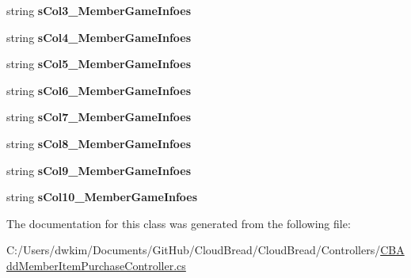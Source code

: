 \begin{DoxyCompactItemize}
\item 
string {\bfseries s\+Col3\+\_\+\+Member\+Game\+Infoes}\hypertarget{a00124_ab735a0ddfb117d85e0cd425fc35d211f}{}\label{a00124_ab735a0ddfb117d85e0cd425fc35d211f}

\item 
string {\bfseries s\+Col4\+\_\+\+Member\+Game\+Infoes}\hypertarget{a00124_a41e17be486561957eb770c1268fbefac}{}\label{a00124_a41e17be486561957eb770c1268fbefac}

\item 
string {\bfseries s\+Col5\+\_\+\+Member\+Game\+Infoes}\hypertarget{a00124_a1fb82579ba67947f34684bbcc304e75a}{}\label{a00124_a1fb82579ba67947f34684bbcc304e75a}

\item 
string {\bfseries s\+Col6\+\_\+\+Member\+Game\+Infoes}\hypertarget{a00124_a2531d163ec3219e281c0e7a6b9ddb27d}{}\label{a00124_a2531d163ec3219e281c0e7a6b9ddb27d}

\item 
string {\bfseries s\+Col7\+\_\+\+Member\+Game\+Infoes}\hypertarget{a00124_a56377cc7982e7d62c0d21480a175687b}{}\label{a00124_a56377cc7982e7d62c0d21480a175687b}

\item 
string {\bfseries s\+Col8\+\_\+\+Member\+Game\+Infoes}\hypertarget{a00124_a1b65e916b4788fbfbfc9bbfe2dfe0d5a}{}\label{a00124_a1b65e916b4788fbfbfc9bbfe2dfe0d5a}

\item 
string {\bfseries s\+Col9\+\_\+\+Member\+Game\+Infoes}\hypertarget{a00124_a22c6b265169ae146d387e0e8b307995b}{}\label{a00124_a22c6b265169ae146d387e0e8b307995b}

\item 
string {\bfseries s\+Col10\+\_\+\+Member\+Game\+Infoes}\hypertarget{a00124_a46c582be57c00dff5546a3860411bdcc}{}\label{a00124_a46c582be57c00dff5546a3860411bdcc}

\end{DoxyCompactItemize}


The documentation for this class was generated from the following file\+:\begin{DoxyCompactItemize}
\item 
C\+:/\+Users/dwkim/\+Documents/\+Git\+Hub/\+Cloud\+Bread/\+Cloud\+Bread/\+Controllers/\hyperlink{a00198}{C\+B\+Add\+Member\+Item\+Purchase\+Controller.\+cs}\end{DoxyCompactItemize}

